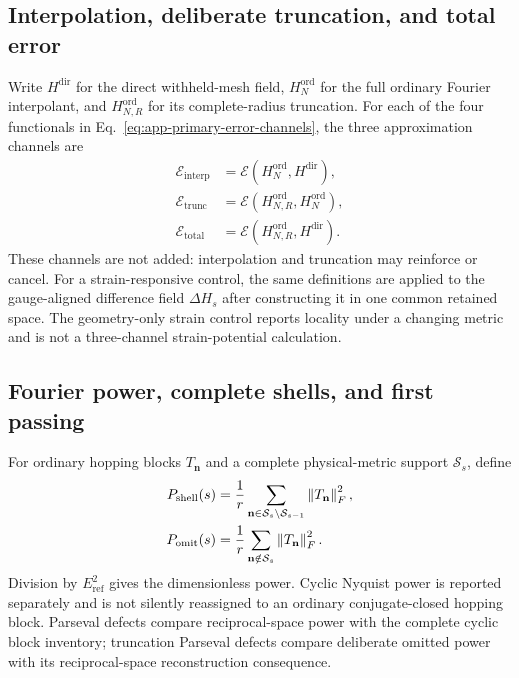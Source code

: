 \subsection{Interpolation, deliberate truncation, and total error}

Write $H^{\mathrm{dir}}$ for the direct withheld-mesh field,
$H_N^{\mathrm{ord}}$ for the full ordinary Fourier interpolant, and
$H_{N,R}^{\mathrm{ord}}$ for its complete-radius truncation. For each of the four
functionals in Eq.~\eqref{eq:app-primary-error-channels}, the three approximation
channels are
\begin{align}
 \mathcal E_{\mathrm{interp}}&=\mathcal E(H_N^{\mathrm{ord}},H^{\mathrm{dir}}),\\
 \mathcal E_{\mathrm{trunc}}&=\mathcal E(H_{N,R}^{\mathrm{ord}},H_N^{\mathrm{ord}}),\\
 \mathcal E_{\mathrm{total}}&=\mathcal E(H_{N,R}^{\mathrm{ord}},H^{\mathrm{dir}}).
 \label{eq:three-error-channels}
\end{align}
These channels are not added: interpolation and truncation may reinforce or cancel. For
a strain-responsive control, the same definitions are applied to the gauge-aligned
difference field $\Delta H_s$ after constructing it in one common retained space. The
geometry-only strain control reports locality under a changing metric and is not a
three-channel strain-potential calculation.

\subsection{Fourier power, complete shells, and first passing}

For ordinary hopping blocks $T_{\mathbf n}$ and a complete physical-metric support
$\mathcal S_s$, define
\begin{align}
 P_{\mathrm{shell}}(s)
 &=\frac1r\sum_{\mathbf n\in\mathcal S_s\setminus\mathcal S_{s-1}}
   \left\lVert T_{\mathbf n}\right\rVert_F^2,\\
 P_{\mathrm{omit}}(s)
 &=\frac1r\sum_{\mathbf n\notin\mathcal S_s}
   \left\lVert T_{\mathbf n}\right\rVert_F^2.
 \label{eq:app-shell-power}
\end{align}
Division by $E_{\mathrm{ref}}^2$ gives the dimensionless power. Cyclic Nyquist power is
reported separately and is not silently reassigned to an ordinary conjugate-closed
hopping block. Parseval defects compare reciprocal-space power with the complete cyclic
block inventory; truncation Parseval defects compare deliberate omitted power with its
reciprocal-space reconstruction consequence.

